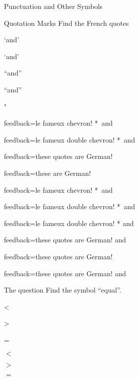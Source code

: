 \documentclass{article}
\begin{document}
\begin{quiz}[points=1.0,shuffle=false]{Punctuation and Other Symbols}
\begin{multi}[multiple]{Quotation Marks}
Find the French quotes
\item `and'
\item \textquoteleft and\textquoteright
\item ``and''
\item \textquotedblleft and\textquotedblright
\item \textquotesingle
\item "
\item \textquotedbl
\item[feedback={le fameux chevron!}]* \guilsinglleft\,and\,\guilsinglright
\item[feedback={le fameux double chevron!}]* 
\guillemotleft\,and\,\guillemotright
\item[feedback={these quotes are German!}] \quotesinglbase
\item[feedback={these are German!}] \quotedblbase 
\item[feedback={le fameux chevron!}]* \flq\,and\,\frq
\item[feedback={le fameux double chevron!}]* \flqq\,and\,\frqq
\item[feedback={le fameux double chevron!}]* \og and\fg
\item[feedback={these quotes are German!}] \glq and\grq
\item[feedback={these quotes are German!}] \dq
\item[feedback={these quotes are German!}] \glqq and\grqq
\end{multi}

\begin{cloze}{The question}
Find the symbol ``equal''.
\begin{multi}
\item <
\item >
\item* =
\end{multi}
\begin{multi}[vertical]
\item $<$
\item $>$
\item* $=$
\end{multi}
\end{cloze}

\end{quiz}
\end{document}
